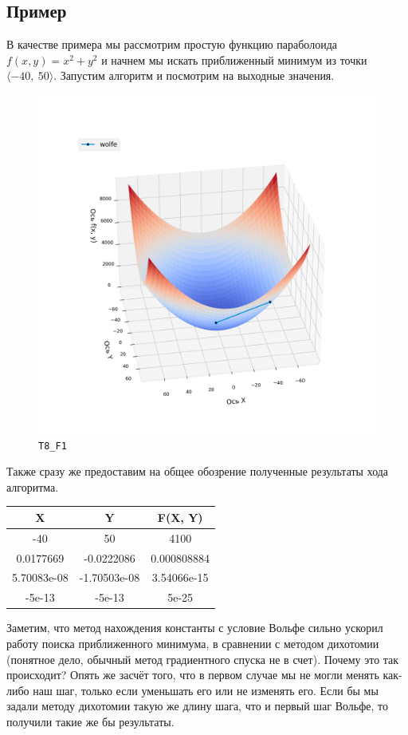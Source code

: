 \documentclass[12pt, a4paper, oneside, final]{article}
\begin{document}
	\subsection*{Пример}
	В качестве примера мы рассмотрим простую функцию параболоида $f(x, y) = x^{2} + y^{2}$ и начнем мы искать приближенный минимум из точки $\langle-40, ~ 50\rangle$. Запустим алгоритм и посмотрим на выходные значения.
	\begin{figure}[H]
		\centering
		\includegraphics[scale=0.48]{Image/T8_F1.png}
		\caption*{\texttt{T8\_F1}}
	\end{figure}
	Также сразу же предоставим на общее обозрение полученные результаты хода алгоритма.
	\begin{table}[H]
		\centering
		\begin{tabular}{|c|c|c|}
			\textbf{X} & \textbf{Y} & \textbf{F(X, Y)} \\ \hline
			-40 & 50 & 4100 \\
			0.0177669 & -0.0222086 & 0.000808884 \\
			5.70083e-08 & -1.70503e-08 & 3.54066e-15 \\
			-5e-13 & -5e-13 & 5e-25
		\end{tabular}
	\end{table}
	Заметим, что метод нахождения константы с условие Вольфе сильно ускорил работу поиска приближенного минимума, в сравнении с методом дихотомии (понятное дело, обычный метод градиентного спуска не в счет). Почему это так происходит? Опять же засчёт того, что в первом случае мы не могли менять как-либо наш шаг, только если уменьшать его или не изменять его. Если бы мы задали методу дихотомии такую же длину шага, что и первый шаг Вольфе, то получили такие же бы результаты.
\end{document}
